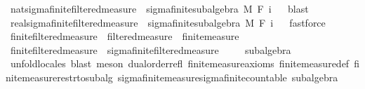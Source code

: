 \begin{isabellebody}
\isanewline
{}\isamarkupfalse%
\ nat{\isacharunderscore}{\kern0pt}sigma{\isacharunderscore}{\kern0pt}finite{\isacharunderscore}{\kern0pt}filtered{\isacharunderscore}{\kern0pt}measure\ {\isasymsubseteq}\ sigma{\isacharunderscore}{\kern0pt}finite{\isacharunderscore}{\kern0pt}subalgebra\ M\ {\isachardoublequoteopen}F\ i{\isachardoublequoteclose}%
\isadelimproof
\ %
\endisadelimproof
%
\isatagproof
{}\isamarkupfalse%
\ blast%
\endisatagproof
{\isafoldproof}%
%
\isadelimproof
%
\endisadelimproof
\isanewline
{}\isamarkupfalse%
\ real{\isacharunderscore}{\kern0pt}sigma{\isacharunderscore}{\kern0pt}finite{\isacharunderscore}{\kern0pt}filtered{\isacharunderscore}{\kern0pt}measure\ {\isasymsubseteq}\ sigma{\isacharunderscore}{\kern0pt}finite{\isacharunderscore}{\kern0pt}subalgebra\ M\ {\isachardoublequoteopen}F\ {\isasymbar}i{\isasymbar}{\isachardoublequoteclose}%
\isadelimproof
\ %
\endisadelimproof
%
\isatagproof
{}\isamarkupfalse%
\ fastforce%
\endisatagproof
{\isafoldproof}%
%
\isadelimproof
%
\endisadelimproof
%
\isadelimdocument
%
\endisadelimdocument
%
\isatagdocument
%
\isamarkuptrue%
%
\endisatagdocument
{\isafolddocument}%
%
\isadelimdocument
%
\endisadelimdocument
{}\isamarkupfalse%
\ finite{\isacharunderscore}{\kern0pt}filtered{\isacharunderscore}{\kern0pt}measure\ {\isacharequal}{\kern0pt}\ filtered{\isacharunderscore}{\kern0pt}measure\ {\isacharplus}{\kern0pt}\ finite{\isacharunderscore}{\kern0pt}measure\isanewline
\isanewline
{}\isamarkupfalse%
\ finite{\isacharunderscore}{\kern0pt}filtered{\isacharunderscore}{\kern0pt}measure\ {\isasymsubseteq}\ sigma{\isacharunderscore}{\kern0pt}finite{\isacharunderscore}{\kern0pt}filtered{\isacharunderscore}{\kern0pt}measure\ \isanewline
%
\isadelimproof
\ \ %
\endisadelimproof
%
\isatagproof
{}\isamarkupfalse%
\ subalgebra\ \isamarkupfalse%
\ {\isacharparenleft}{\kern0pt}unfold{\isacharunderscore}{\kern0pt}locales{\isacharcomma}{\kern0pt}\ blast{\isacharcomma}{\kern0pt}\ meson\ dual{\isacharunderscore}{\kern0pt}order{\isachardot}{\kern0pt}refl\ finite{\isacharunderscore}{\kern0pt}measure{\isacharunderscore}{\kern0pt}axioms\ finite{\isacharunderscore}{\kern0pt}measure{\isacharunderscore}{\kern0pt}def\ finite{\isacharunderscore}{\kern0pt}measure{\isacharunderscore}{\kern0pt}restr{\isacharunderscore}{\kern0pt}to{\isacharunderscore}{\kern0pt}subalg\ sigma{\isacharunderscore}{\kern0pt}finite{\isacharunderscore}{\kern0pt}measure{\isachardot}{\kern0pt}sigma{\isacharunderscore}{\kern0pt}finite{\isacharunderscore}{\kern0pt}countable\ subalgebra{\isacharparenright}{\kern0pt}%

\end{isabellebody}
